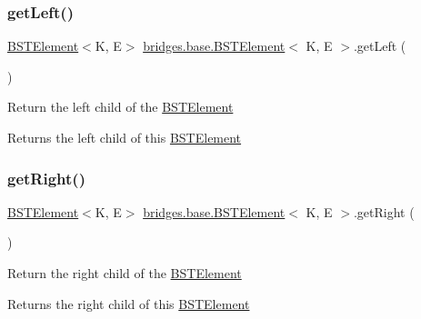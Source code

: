 \subsubsection{\texorpdfstring{getLeft()}{getLeft()}}
{\footnotesize\ttfamily \mbox{\hyperlink{classbridges_1_1base_1_1_b_s_t_element}{B\+S\+T\+Element}}$<$K, E$>$ \mbox{\hyperlink{classbridges_1_1base_1_1_b_s_t_element}{bridges.\+base.\+B\+S\+T\+Element}}$<$ K, E $>$.get\+Left (\begin{DoxyParamCaption}{ }\end{DoxyParamCaption})}

Return the left child of the \mbox{\hyperlink{classbridges_1_1base_1_1_b_s_t_element}{B\+S\+T\+Element}}

\begin{DoxyReturn}{Returns}
the left child of this \mbox{\hyperlink{classbridges_1_1base_1_1_b_s_t_element}{B\+S\+T\+Element}} 
\end{DoxyReturn}
\mbox{\label{classbridges_1_1base_1_1_b_s_t_element_ae7ed1b98f48acfcfc0a3a5bf6219ce00}} 
\subsubsection{\texorpdfstring{getRight()}{getRight()}}
{\footnotesize\ttfamily \mbox{\hyperlink{classbridges_1_1base_1_1_b_s_t_element}{B\+S\+T\+Element}}$<$K, E$>$ \mbox{\hyperlink{classbridges_1_1base_1_1_b_s_t_element}{bridges.\+base.\+B\+S\+T\+Element}}$<$ K, E $>$.get\+Right (\begin{DoxyParamCaption}{ }\end{DoxyParamCaption})}

Return the right child of the \mbox{\hyperlink{classbridges_1_1base_1_1_b_s_t_element}{B\+S\+T\+Element}}

\begin{DoxyReturn}{Returns}
the right child of this \mbox{\hyperlink{classbridges_1_1base_1_1_b_s_t_element}{B\+S\+T\+Element}} 
\end{DoxyReturn}
\mbox{\label{classbridges_1_1base_1_1_b_s_t_element_a51990b684df6998dc25b324dc7631ab4}} 
